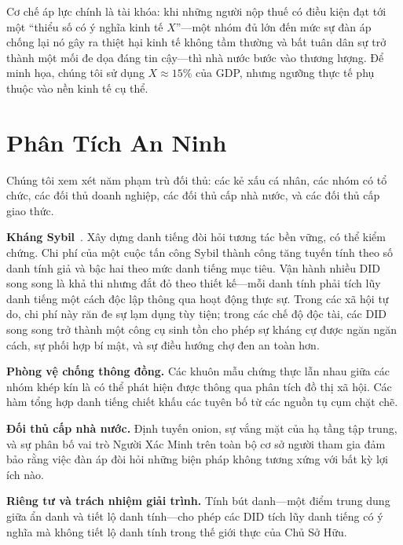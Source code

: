 \documentclass[11pt,a4paper,twocolumn]{article}
\begin{document}
Cơ chế áp lực chính là tài khóa: khi những người nộp thuế có điều kiện đạt tới một ``thiểu số có ý nghĩa kinh tế $X$''---một nhóm đủ lớn đến mức sự đàn áp chống lại nó gây ra thiệt hại kinh tế không tầm thường và bất tuân dân sự trở thành một mối đe dọa đáng tin cậy---thì nhà nước bước vào thương lượng. Để minh họa, chúng tôi sử dụng $X \approx 15\%$ của GDP, nhưng ngưỡng thực tế phụ thuộc vào nền kinh tế cụ thể.

\section{Phân Tích An Ninh}

Chúng tôi xem xét năm phạm trù đối thủ: các kẻ xấu cá nhân, các nhóm có tổ chức, các đối thủ doanh nghiệp, các đối thủ cấp nhà nước, và các đối thủ cấp giao thức.

\textbf{Kháng Sybil}~\cite{douceur2002}. Xây dựng danh tiếng đòi hỏi tương tác bền vững, có thể kiểm chứng. Chi phí của một cuộc tấn công Sybil thành công tăng tuyến tính theo số danh tính giả và bậc hai theo mức danh tiếng mục tiêu. Vận hành nhiều DID song song là khả thi nhưng đắt đỏ theo thiết kế---mỗi danh tính phải tích lũy danh tiếng một cách độc lập thông qua hoạt động thực sự. Trong các xã hội tự do, chi phí này răn đe sự lạm dụng tùy tiện; trong các chế độ độc tài, các DID song song trở thành một công cụ sinh tồn cho phép sự kháng cự được ngăn ngăn cách, sự phối hợp bí mật, và sự điều hướng chợ đen an toàn hơn.

\textbf{Phòng vệ chống thông đồng.} Các khuôn mẫu chứng thực lẫn nhau giữa các nhóm khép kín là có thể phát hiện được thông qua phân tích đồ thị xã hội. Các hàm tổng hợp danh tiếng chiết khấu các tuyên bố từ các nguồn tụ cụm chặt chẽ.

\textbf{Đối thủ cấp nhà nước.} Định tuyến onion, sự vắng mặt của hạ tầng tập trung, và sự phân bố vai trò Người Xác Minh trên toàn bộ cơ sở người tham gia đảm bảo rằng việc đàn áp đòi hỏi những biện pháp không tương xứng với bất kỳ lợi ích nào.

\textbf{Riêng tư và trách nhiệm giải trình.} Tính bút danh---một điểm trung dung giữa ẩn danh và tiết lộ danh tính---cho phép các DID tích lũy danh tiếng có ý nghĩa mà không tiết lộ danh tính trong thế giới thực của Chủ Sở Hữu.

\end{document}
